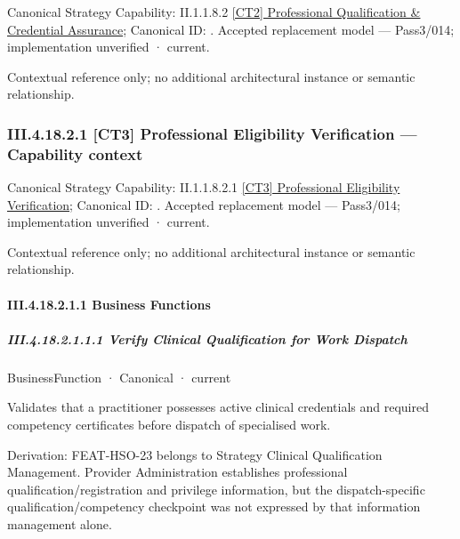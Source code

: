 {\small Canonical Strategy Capability: II.1.1.8.2 \hyperref[element:364a54333b644107ba9ae3ecc76ba186]{[CT2] Professional Qualification \& Credential Assurance}; Canonical ID: \texttt{}. Accepted replacement model — Pass3/014; implementation unverified · current.}\par
Contextual reference only; no additional architectural instance or semantic relationship.\par
\subsubsection*{III.4.18.2.1 [CT3] Professional Eligibility Verification — Capability context}
\label{navigation:III.4.18.2.1}

{\small Canonical Strategy Capability: II.1.1.8.2.1 \hyperref[element:3b43d350a52a4b608bc01eb2530a91be]{[CT3] Professional Eligibility Verification}; Canonical ID: \texttt{}. Accepted replacement model — Pass3/014; implementation unverified · current.}\par
Contextual reference only; no additional architectural instance or semantic relationship.\par
\paragraph*{III.4.18.2.1.1 Business Functions}
\label{navigation:III.4.18.2.1.1}

\subparagraph*{III.4.18.2.1.1.1 Verify Clinical Qualification for Work Dispatch}
\label{navigation:III.4.18.2.1.1.1}

\label{element:1dfebc3aa5f949e5a20faa504eadbee1}
{\small BusinessFunction · Canonical · current}\par

Validates that a practitioner possesses active clinical credentials and required competency certificates before dispatch of specialised work.



Derivation: FEAT-HSO-23 belongs to Strategy Clinical Qualification Management. Provider Administration establishes professional qualification/registration and privilege information, but the dispatch-specific qualification/competency checkpoint was not expressed by that information management alone.


